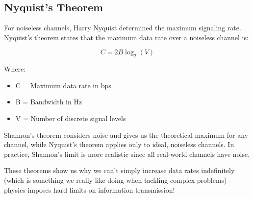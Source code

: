 \subsection*{Nyquist's Theorem}
For noiseless channels, Harry Nyquist determined the maximum signaling rate. Nyquist's theorem states that the maximum data rate over a noiseless channel is:

\begin{equation}
C = 2B \log_2(V)
\end{equation}

Where:
\begin{itemize}
    \item C = Maximum data rate in bps
    \item B = Bandwidth in Hz
    \item V = Number of discrete signal levels
\end{itemize}

\begin{importantblock}
    Shannon's theorem considers noise and gives us the theoretical maximum for any channel, while Nyquist's theorem applies only to ideal, noiseless channels. In practice, Shannon's limit is more realistic since all real-world channels have noise.
\end{importantblock}

These theorems show us why we can't simply increase data rates indefinitely (which is something we really like doing when tackling complex problems) - physics imposes hard limits on information transmission!